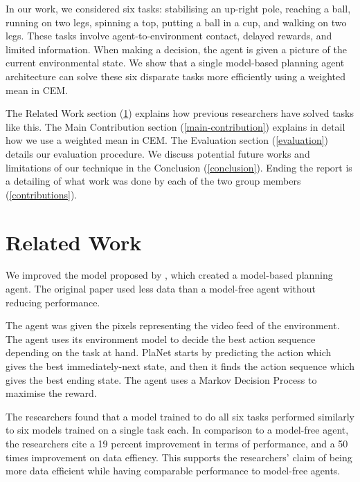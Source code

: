 \documentclass{IEEEtran}
\begin{document}
In our work, we considered six tasks: stabilising an up-right pole, reaching a ball, running on two legs, spinning a top, putting a ball in a cup, and walking on two legs.
These tasks involve agent-to-environment contact, delayed rewards, and limited information.
When making a decision, the agent is given a picture of the current environmental state.
We show that a single model-based planning agent architecture can solve these six disparate tasks more efficiently using a weighted mean in CEM.

The Related Work section (\ref{related-work}) explains how previous researchers have solved tasks like this.
The Main Contribution section (\ref{main-contribution}) explains in detail how we use a weighted mean in CEM.
The Evaluation section (\ref{evaluation}) details our evaluation procedure.
We discuss potential future works and limitations of our technique in the Conclusion (\ref{conclusion}).
Ending the report is a detailing of what work was done by each of the two group members (\ref{contributions}).

\section{Related Work}\label{related-work}
We improved the model proposed by \cite{hafner2018planet}, which created a model-based planning agent.
The original paper used less data than a model-free agent without reducing performance.

The agent was given the pixels representing the video feed of the environment.
The agent uses its environment model to decide the best action sequence depending on the task at hand.
PlaNet starts by predicting the action which gives the best immediately-next state, and then it finds the action sequence which gives the best ending state.
The agent uses a Markov Decision Process to maximise the reward. 

The researchers found that a model trained to do all six tasks performed similarly to six models trained on a single task each.
In comparison to a model-free agent, the researchers cite a 19 percent improvement in terms of performance, and a 50 times improvement on data effiency. 
This supports the researchers' claim of being more data efficient while having comparable performance to model-free agents.

\end{document}
